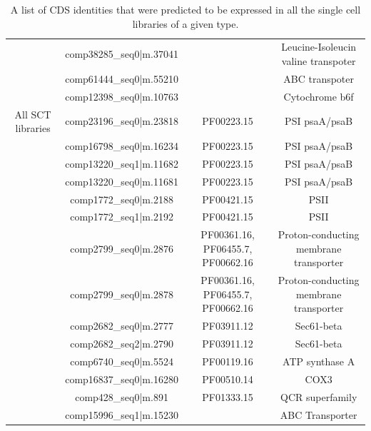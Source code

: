 \begin{table}
\begin{tabular}{|c|c|c|c|}
                            & comp38285\_seq0|m.37041 & & Leucine-Isoleucin valine transpoter \\
                            & comp61444\_seq0|m.55210 & & ABC transpoter \\
                            & comp12398\_seq0|m.10763 & & Cytochrome b6f \\
        \hline
        All SCT libraries   & comp23196\_seq0|m.23818 & PF00223.15 & PSI psaA/psaB \\
                            &  comp16798\_seq0|m.16234 & PF00223.15 & PSI psaA/psaB \\
                            &  comp13220\_seq1|m.11682 & PF00223.15 & PSI psaA/psaB \\
                            &  comp13220\_seq0|m.11681 & PF00223.15 & PSI psaA/psaB \\ 
                            &  comp1772\_seq0|m.2188  & PF00421.15 & PSII \\
                            &  comp1772\_seq1|m.2192 & PF00421.15 & PSII \\
                            &  comp2799\_seq0|m.2876  & PF00361.16, PF06455.7, PF00662.16 & Proton-conducting membrane transporter\\ %
                            &  comp2799\_seq0|m.2878 & PF00361.16, PF06455.7, PF00662.16 & Proton-conducting membrane transporter\\ %
                            &  comp2682\_seq0|m.2777& PF03911.12 & Sec61-beta \\
                            &  comp2682\_seq2|m.2790& PF03911.12 & Sec61-beta \\
                            &  comp6740\_seq0|m.5524& PF00119.16 & ATP synthase A \\
                            &  comp16837\_seq0|m.16280& PF00510.14 & COX3 \\
                            &  comp428\_seq0|m.891& PF01333.15 & QCR superfamily \\
                            &  comp15996\_seq1|m.15230 & & ABC Transporter \\
        \hline
    \end{tabular}
    \caption{A list of CDS identities that were predicted to be expressed in all the single cell
    libraries of a given type.}
    \label{tab:consensus_transporters}
\end{table}

